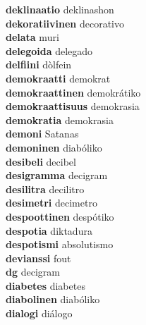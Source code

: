 \textbf{deklinaatio } deklinashon \\
\textbf{dekoratiivinen } decorativo \\
\textbf{delata } muri \\
\textbf{delegoida } delegado \\
\textbf{delfiini } dòlfein \\
\textbf{demokraatti } demokrat \\
\textbf{demokraattinen } demokrátiko \\
\textbf{demokraattisuus } demokrasia \\
\textbf{demokratia } demokrasia \\
\textbf{demoni } Satanas \\
\textbf{demoninen } diabóliko \\
\textbf{desibeli } decibel \\
\textbf{desigramma } decigram \\
\textbf{desilitra } decilitro \\
\textbf{desimetri } decimetro \\
\textbf{despoottinen } despótiko \\
\textbf{despotia } diktadura \\
\textbf{despotismi } absolutismo \\
\textbf{devianssi } fout \\
\textbf{dg } decigram \\
\textbf{diabetes } diabetes \\
\textbf{diabolinen } diabóliko \\
\textbf{dialogi } diálogo \\
